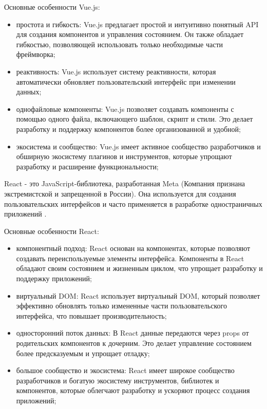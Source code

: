 Основные особенности Vue.js:

\begin{itemize}
    \item простота и гибкость: Vue.js предлагает простой и интуитивно понятный API для создания компонентов и управления состоянием. Он также обладает гибкостью, позволяющей использовать только необходимые части фреймворка;
    \item реактивность: Vue.js использует систему реактивности, которая автоматически обновляет пользовательский интерфейс при изменении данных;
    \item однофайловые компоненты: Vue.js позволяет создавать компоненты с помощью одного файла, включающего шаблон, скрипт и стили. Это делает разработку и поддержку компонентов более организованной и удобной;
    \item экосистема и сообщество: Vue.js имеет активное сообщество разработчиков и обширную экосистему плагинов и инструментов, которые упрощают разработку и расширение функциональности;
\end{itemize}

React - это JavaScript-библиотека, разработанная Meta (Компания признана экстремистской и запрещенной в России). Она используется для создания пользовательских интерфейсов и часто применяется в разработке одностраничных приложений \cite{React.js}. 

Основные особенности React:

\begin{itemize}
    \item компонентный подход: React основан на компонентах, которые позволяют создавать переиспользуемые элементы интерфейса. Компоненты в React обладают своим состоянием и жизненным циклом, что упрощает разработку и поддержку приложений;
    \item виртуальный DOM: React использует виртуальный DOM, который позволяет эффективно обновлять только измененные части пользовательского интерфейса, что повышает производительность;
    \item односторонний поток данных: В React данные передаются через props от родительских компонентов к дочерним. Это делает управление состоянием более предсказуемым и упрощает отладку;
    \item большое сообщество и экосистема: React имеет широкое сообщество разработчиков и богатую экосистему инструментов, библиотек и компонентов, которые облегчают разработку и ускоряют процесс создания приложений;
\end{itemize}

